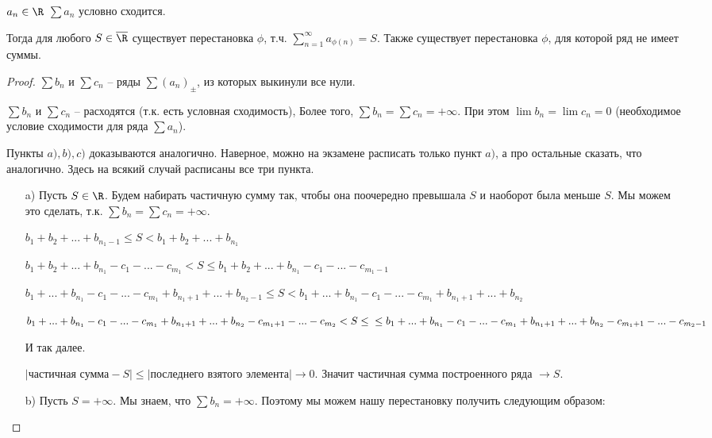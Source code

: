 \begin{theorem}[Римана]  \thmslashn
	
	$a_n \in \R$  $\sum a_n$ условно сходится.
	
	Тогда для любого $S \in \overline{\R}$ существует перестановка $\phi$, т.ч. $\sum\limits_{n = 1}^{\infty}a_{\phi(n)} = S$. Также существует перестановка $\phi$, для которой ряд не имеет суммы.
\end{theorem}

\begin{proof}  \thmslashn
	
	$\sum b_n$ и $\sum c_n$ -- ряды $\sum (a_n)_{\pm}$, из которых выкинули все нули.
	
	$\sum b_n$ и $\sum c_n$ -- расходятся (т.к. есть условная сходимость), Более того, $\sum b_n = \sum c_n = +\infty$. При этом $\lim b_n = \lim c_n = 0$ (необходимое условие сходимости для ряда $\sum a_n$).
	
	Пункты $a), b), c)$ доказываются аналогично. Наверное, можно на экзамене расписать только пункт $a)$, а про остальные сказать, что аналогично. Здесь на всякий случай расписаны все три пункта.
	\begin{enumerate}
	
	\item[a)] Пусть $S \in \R$. Будем набирать частичную сумму так, чтобы она поочередно превышала $S$ и наоборот была меньше $S$. Мы можем это сделать, т.к. $\sum b_n = \sum c_n = +\infty$.
	
	$b_1+b_2+...+b_{n_1 - 1} \le S < b_1 + b_2 + ... + b_{n_1}$ 
	
	$b_1+b_2+...+b_{n_1} -c_1-...-c_{m_1} < S\le b_1+b_2+...+b_{n_1}-c_1-...-c_{m_1 - 1}$
	
	$b_1+...+b_{n_1}-c_1-...-c_{m_1} + b_{n_1+1} + ...+b_{n_2 - 1} \le S < b_1+...+b_{n_1}-c_1-...-c_{m_1} + b_{n_1+1} + ...+b_{n_2}$
	
	$b_1+...+b_{n_1}-c_1-...-c_{m_1} + b_{n_1+1} + ...+b_{n_2} - c_{m_1+1}-...-c_{m_2} < S \le\\\le b_1+...+b_{n_1}-c_1-...-c_{m_1} + b_{n_1+1} + ...+b_{n_2}-c_{m_1+1}-...-c_{m_2-1}$
	
	
	И так далее.
	
	$|\text{частичная сумма} - S| \le |\text{последнего взятого элемента}| \to 0$. Значит частичная сумма построенного ряда $\to S$.
	
	\item[b)] Пусть $S = +\infty$. Мы знаем, что $\sum b_n = +\infty$. Поэтому мы можем нашу перестановку получить следующим образом:
	

\end{enumerate}
\end{proof}
